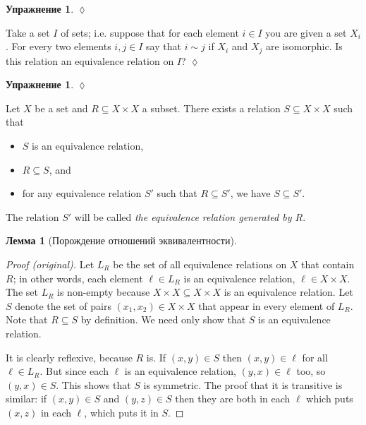 \documentclass[a4paper]{book}
\def\ss{\subseteq}
\theoremstyle{myth}
\newtheorem{lemmaENG}[envENG]{\begin{english}Lemma\end{english}}
\newtheorem{excENG}[envENG]{\begin{english}Exercise\end{english}}
\newenvironment{proofENG}{\begin{proof}[Proof (original)]}{\end{proof}}
\newenvironment{exerciseENG}{\begin{excENG}}{\hspace*{\fill}$\lozenge$\end{excENG}}
\newtheorem{lemmaRUS}[envRUS]{Лемма}
\newtheorem{excRUS}[envRUS]{Упражнение}
\newenvironment{exerciseRUS}{\begin{excRUS}}{\hspace*{\fill}$\lozenge$\end{excRUS}}
\begin{document}
\begin{russian}
\begin{exerciseRUS}
 
\end{exerciseRUS}

\begin{exerciseENG}
Take a set $I$ of sets; i.e. suppose that for each element $i\in I$ you are given a set $X_i$. For every two elements $i,j\in I$ say that $i\sim j$ if $X_i$ and $X_j$ are isomorphic. Is this relation an equivalence relation on $I$?  
\end{exerciseENG}

\begin{exerciseRUS}
 
\end{exerciseRUS}

\begin{lemmaENG}\label{lemma:generating ERs}
Let $X$ be a set and $R\ss X\times X$ a subset. There exists a relation $S\ss X\times X$ such that
\begin{itemize}
\item $S$ is an equivalence relation,
\item $R\ss S$, and
\item for any equivalence relation $S'$ such that $R\ss S'$, we have $S\ss S'$.
\end{itemize}
The relation $S'$ will be called {\em the equivalence relation generated by $R$}.
\end{lemmaENG}

\begin{lemmaRUS}[Порождение отношений эквивалентности]\label{lemma:generating ERs}
 
\end{lemmaRUS}

\begin{proofENG}
Let $L_R$ be the set of all equivalence relations on $X$ that contain $R$; in other words, each element $\ell\in L_R$ is an equivalence relation, $\ell\in X\times X$. The set $L_R$ is non-empty because $X\times X\ss X\times X$ is an equivalence relation. Let $S$ denote the set of pairs $(x_1,x_2)\in X\times X$ that appear in every element of $L_R$. Note that $R\ss S$ by definition. We need only show that $S$ is an equivalence relation.

It is clearly reflexive, because $R$ is. If $(x,y)\in S$ then $(x,y)\in\ell$ for all $\ell\in L_R$. But since each $\ell$ is an equivalence relation, $(y,x)\in\ell$ too, so $(y,x)\in S$. This shows that $S$ is symmetric. The proof that it is transitive is similar: if $(x,y)\in S$ and $(y,z)\in S$ then they are both in each $\ell$ which puts $(x,z)$ in each $\ell$, which puts it in $S$.
\end{proofENG}


\end{russian}
\end{document}
